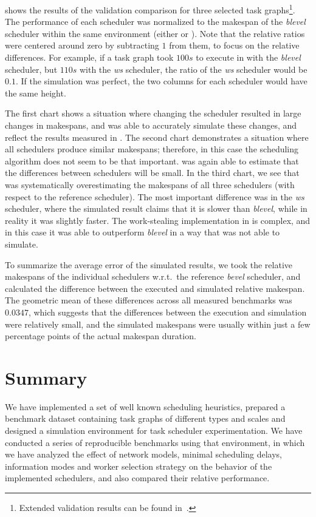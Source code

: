  shows the results of the validation comparison for three selected
task graphs\footnote{Extended validation results can be found in~\cite{estee}.}. The performance of each scheduler was normalized to the
makespan of the \emph{blevel} scheduler within the same environment (either
\estee{} or \dask{}). Note that the relative ratios were centered
around zero by subtracting $1$ from them, to focus on the relative differences.
For example, if a task graph took $100s$ to execute in \dask{} with
the \emph{blevel} scheduler, but $110s$ with the \emph{ws}
scheduler, the ratio of the \emph{ws} scheduler would be $0.1$. If
the simulation was perfect, the two columns for each scheduler would have the same height.

The first chart shows a situation where changing the scheduler resulted in large changes in
makespans, and \estee{} was able to accurately simulate these changes, and reflect
the results measured in \dask{}. The second chart demonstrates a situation where
all schedulers produce similar makespans; therefore, in this case the scheduling algorithm does not
seem to be that important. \estee{} was again able to estimate that the differences
between schedulers will be small. In the third chart, we see that \estee{} was
systematically overestimating the makespans of all three schedulers (with respect to the reference
scheduler). The most important difference was in the \emph{ws} scheduler, where the
simulated result claims that it is slower than \emph{blevel}, while in reality it was
slightly faster. The work-stealing implementation in \dask{} is complex, and in
this case it was able to outperform \emph{blevel} in a way that \estee{}
was not able to simulate.

To summarize the average error of the simulated results, we took the relative makespans of the
individual schedulers w.r.t.\ the reference \emph{bevel} scheduler, and calculated the
difference between the executed and simulated relative makespan. The geometric mean of these
differences across all measured benchmarks was $0.0347$, which suggests that the
differences between the execution and simulation were relatively small, and the simulated makespans
were usually within just a few percentage points of the actual makespan duration.

\section*{Summary}
We have implemented a set of well known scheduling heuristics, prepared a benchmark dataset
containing task graphs of different types and scales and designed a simulation environment for task
scheduler experimentation. We have conducted a series of reproducible benchmarks using that
environment, in which we have analyzed the effect of network models, minimal scheduling delays,
information modes and worker selection strategy on the behavior of the implemented schedulers, and
also compared their relative performance.

